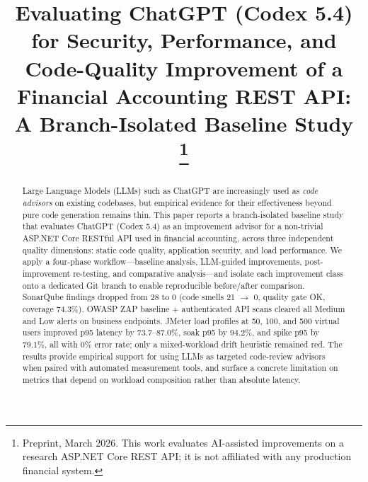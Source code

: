 \documentclass[conference]{IEEEtran}
\begin{document}
\title{Evaluating ChatGPT (Codex 5.4) for Security, Performance, and Code-Quality Improvement of a Financial Accounting REST API: A Branch-Isolated Baseline Study\\
{\footnotesize \textsuperscript{}}
\thanks{Preprint, March 2026. This work evaluates AI-assisted improvements on a research ASP.NET Core REST API; it is not affiliated with any production financial system.}}

\author{
\and
{}
}

\maketitle

\begin{abstract}
Large Language Models (LLMs) such as ChatGPT are increasingly used as \emph{code advisors} on existing codebases, but empirical evidence for their effectiveness beyond pure code generation remains thin. This paper reports a branch-isolated baseline study that evaluates ChatGPT (Codex 5.4) as an improvement advisor for a non-trivial ASP.NET Core RESTful API used in financial accounting, across three independent quality dimensions: static code quality, application security, and load performance. We apply a four-phase workflow---baseline analysis, LLM-guided improvements, post-improvement re-testing, and comparative analysis---and isolate each improvement class onto a dedicated Git branch to enable reproducible before/after comparison. SonarQube findings dropped from 28 to 0 (code smells 21 $\rightarrow$ 0, quality gate OK, coverage 74.3\%). OWASP ZAP baseline + authenticated API scans cleared all Medium and Low alerts on business endpoints. JMeter load profiles at 50, 100, and 500 virtual users improved p95 latency by 73.7--87.0\%, soak p95 by 94.2\%, and spike p95 by 79.1\%, all with 0\% error rate; only a mixed-workload drift heuristic remained red. The results provide empirical support for using LLMs as targeted code-review advisors when paired with automated measurement tools, and surface a concrete limitation on metrics that depend on workload composition rather than absolute latency.
\end{abstract}
\end{document}
